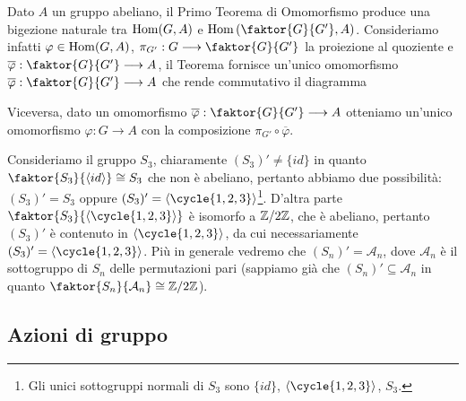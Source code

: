 \documentclass[11pt]{scrartcl}
\begin{document}
\begin{remark}
    Dato $A$ un gruppo abeliano, il Primo Teorema di Omomorfismo produce una bigezione naturale tra 
    $\operatorname{Hom}(G, A)$ e $\Hom\left(\faktor{G}{G'}, A\right)$. Consideriamo infatti $\varphi \in \operatorname{Hom}(G, A)$,
    $\pi_{G'}: G \longrightarrow \faktor{G}{G'}$ la proiezione al quoziente e 
    $\overline{\varphi} : \faktor{G}{G'}\longrightarrow A$, il Teorema
    fornisce un'unico omomorfismo $\overline{\varphi}: \faktor{G}{G'}\longrightarrow A$
    che rende commutativo il diagramma
    \begin{center}
    \end{center}
    Viceversa, dato un omomorfismo $\overline{\varphi}:\faktor{G}{G'}\longrightarrow A$
    otteniamo un'unico omomorfismo $\varphi:G\longrightarrow A$ con la 
    composizione $\pi_{G'}\circ\overline{\varphi}$.
\end{remark}

\begin{example}
    Consideriamo il gruppo $S_3$, chiaramente $(S_3)' \neq \{id\}$ in quanto
    $\faktor{S_3}{\langle id\rangle} \cong S_3$ che non è abeliano, pertanto 
    abbiamo due possibilità: $(S_3)' = S_3$ oppure $(S_3)' = \langle\cycle{1, 2, 3}\rangle$\footnote{
        Gli unici sottogruppi normali di $S_3$ sono $\{id\}$, 
        $\langle\cycle{1, 2, 3}\rangle$, $S_3$.}. D'altra parte 
        $\faktor{S_3}{\langle\cycle{1, 2, 3}\rangle}$ è isomorfo a $\mathbb{Z}/{2}\mathbb{Z}$, che
        è abeliano, pertanto $(S_3)'$ è contenuto in $\langle\cycle{1, 2, 3}\rangle$,
        da cui necessariamente $(S_3)' = \langle\cycle{1, 2, 3}\rangle$.
        Più in generale vedremo che $(S_n)' = \mathcal{A}_n$, dove $\mathcal{A}_n$ è il sottogruppo
        di $S_n$ delle permutazioni pari (sappiamo già che $(S_n)' \subseteq
        \mathcal{A}_n$ in quanto $\faktor{S_n}{\mathcal{A}_n}\cong\Z2$).
\end{example}

\newpage

\subsection{Azioni di gruppo}
\end{document}
